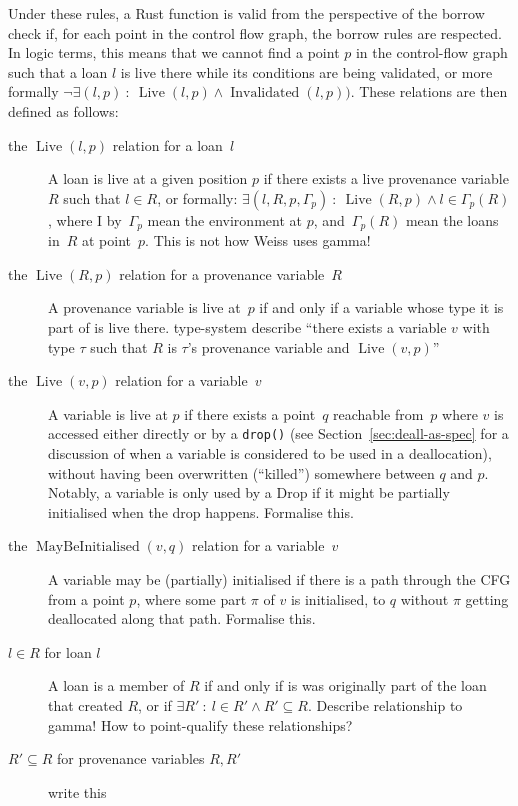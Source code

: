 \documentclass[11pt,a4paper,twoside,openany]{report}
\newcommand{\fixme}[1] {{\color{red}#1}}
\newcommand{\InRust}[1]{\texttt{#1}}
\newcommand{\Loan}[0]{l}
\DeclareMathOperator{\Live}{Live}
\DeclareMathOperator{\Invalidated}{Invalidated}
\DeclareMathOperator{\MayBeInitialised}{MayBeInitialised}
\begin{document}
Under these rules, a Rust function is valid from the perspective of the borrow
check if, for each point in the control flow graph, the borrow rules are
respected. In logic terms, this means that we cannot find a point $p$ in the
control-flow graph such that a loan $\Loan$ is live there while its conditions
are being validated, or more formally $\lnot \exists(\Loan, p) \: : \:
\Live(\Loan, p) \land \Invalidated(\Loan, p))$. These relations are then defined
as follows:
\begin{description}
\item[the $\Live(\Loan, p)$ relation for a loan~$\Loan$] A loan is live at a given
  position $p$ if there exists a live provenance variable $R$ such that $\Loan
  \in R$, or formally: $\exists(\Loan, R, p, \Gamma_p) \: : \: \Live(R, p) \land
  \Loan \in \Gamma_p(R)$, where I by~$\Gamma_p$ mean the environment at $p$,
  and~$\Gamma_p(R)$ mean the loans in~$R$ at point~$p$. \fixme{This is not how
    Weiss uses gamma!}
\item[the $\Live(R, p)$ relation for a provenance variable~$R$] A provenance
  variable is live at~$p$ if and only if a variable whose type it is part of is
  live there. \fixme{type-system describe ``there exists a variable $v$ with
    type $\tau$ such that $R$ is $\tau$'s provenance variable and $\Live(v,
    p)$''}
\item[the $\Live(v, p)$ relation for a variable~$v$] A variable is live at $p$
  if there exists a point~$q$ reachable from~$p$ where $v$ is accessed either
  directly or by a \InRust{drop()} (see Section~\ref{sec:deall-as-spec} for a
  discussion of when a variable is considered to be used in a deallocation),
  without having been overwritten (``killed'') somewhere between $q$ and $p$.
  Notably, a variable is only used by a Drop if it might be partially
  initialised when the drop happens. \fixme{Formalise this.}
\item[the $\MayBeInitialised(v, q)$ relation for a variable~$v$] A variable may
  be (partially) initialised if there is a path through the CFG from a point
  $p$, where some part $\pi$ of $v$ is initialised, to $q$ without $\pi$ getting
  deallocated along that path. \fixme{Formalise this.}
\item[$\Loan \in R$ for loan $\Loan$] A loan is a member of $R$ if and only if is
  was originally part of the loan that created $R$, or if $\exists R' \: :
  \:\Loan \in R' \land R' \subseteq R$. \fixme{Describe relationship to gamma!}
  \fixme{How to point-qualify these relationships?}
  \item[$R' \subseteq R$ for provenance variables $R, R'$] \fixme{write this}
\end{description}
\end{document}
